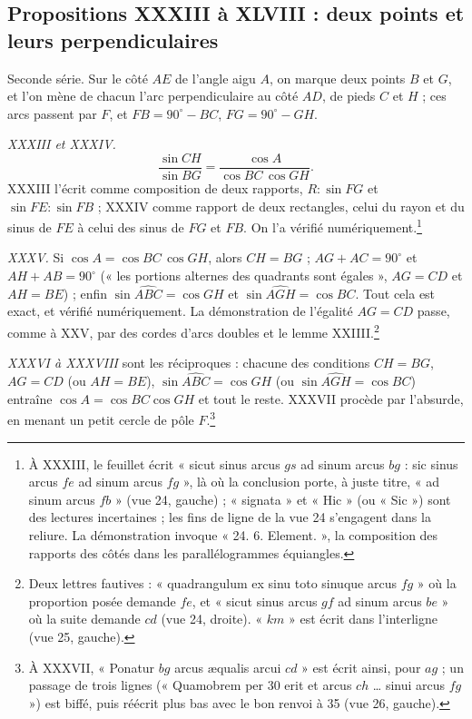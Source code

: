 \documentclass[11pt,a4paper]{article}
\begin{document}
\subsection*{Propositions XXXIII à XLVIII : deux points et leurs perpendiculaires}

Seconde série. Sur le côté $AE$ de l'angle aigu $A$, on marque deux points $B$ et
$G$, et l'on mène de chacun l'arc perpendiculaire au côté $AD$, de pieds $C$ et
$H$ ; ces arcs passent par $F$, et $FB = 90^\circ - BC$, $FG = 90^\circ - GH$.

\emph{XXXIII et XXXIV.}
\[
\frac{\sin CH}{\sin BG} = \frac{\cos A}{\cos BC\,\cos GH} .
\]
XXXIII l'écrit comme composition de deux rapports, $R : \sin FG$ et
$\sin FE : \sin FB$ ; XXXIV comme rapport de deux rectangles, celui du rayon et
du sinus de $FE$ à celui des sinus de $FG$ et $FB$. On l'a vérifié
numériquement.\footnote{À XXXIII, le feuillet écrit « sicut sinus arcus $gs$ ad
sinum arcus $bg$ : sic sinus arcus $fe$ ad sinum arcus $fg$ », là où la
conclusion porte, à juste titre, « ad sinum arcus $fb$ » (vue 24, gauche) ;
« signata » et « Hic » (ou « Sic ») sont des lectures incertaines ; les fins de
ligne de la vue 24 s'engagent dans la reliure. La démonstration invoque « 24. 6.
Element. », la composition des rapports des côtés dans les parallélogrammes
équiangles.}

\emph{XXXV.} Si $\cos A = \cos BC\,\cos GH$, alors $CH = BG$ ; $AG + AC = 90^\circ$
et $AH + AB = 90^\circ$ (« les portions alternes des quadrants sont égales »,
$AG = CD$ et $AH = BE$) ; enfin $\sin\widehat{ABC} = \cos GH$ et
$\sin\widehat{AGH} = \cos BC$. Tout cela est exact, et vérifié
numériquement. La démonstration de l'égalité $AG = CD$ passe, comme à XXV, par
des cordes d'arcs doubles et le lemme XXIIII.\footnote{Deux lettres fautives : « quadrangulum ex sinu toto
sinuque arcus $fg$ » où la proportion posée demande $fe$, et « sicut sinus arcus
$gf$ ad sinum arcus $be$ » où la suite demande $cd$ (vue 24, droite). « $km$ » est
écrit dans l'interligne (vue 25, gauche).}

\emph{XXXVI à XXXVIII} sont les réciproques : chacune des conditions $CH = BG$,
$AG = CD$ (ou $AH = BE$), $\sin\widehat{ABC} = \cos GH$ (ou
$\sin\widehat{AGH} = \cos BC$) entraîne $\cos A = \cos BC\cos GH$ et tout le
reste. XXXVII procède par l'absurde, en menant un petit cercle de pôle $F$.\footnote{À
XXXVII, « Ponatur $bg$ arcus æqualis arcui $cd$ » est écrit ainsi, pour
$ag$ ; un passage de trois lignes (« Quamobrem per 30 erit et arcus $ch$ … sinui
arcus $fg$ ») est biffé, puis réécrit plus bas avec le bon renvoi à 35 (vue 26,
gauche).}
\end{document}

